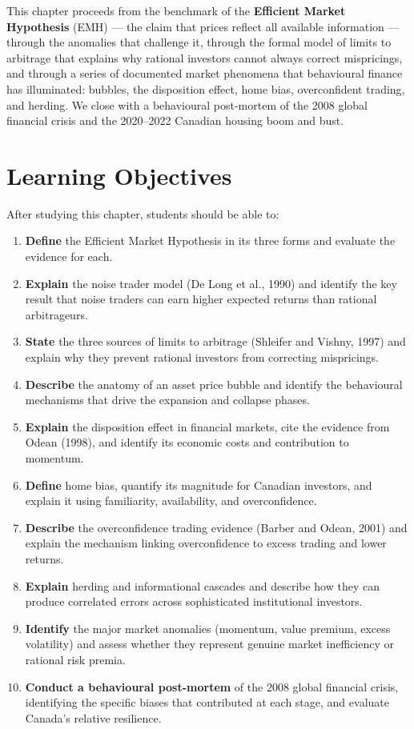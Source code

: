 \documentclass[12pt, letterpaper]{article}
\begin{document}
This chapter proceeds from the benchmark of the \textbf{Efficient Market Hypothesis} (EMH) --- the claim that prices reflect all available information --- through the anomalies that challenge it, through the formal model of limits to arbitrage that explains why rational investors cannot always correct mispricings, and through a series of documented market phenomena that behavioural finance has illuminated: bubbles, the disposition effect, home bias, overconfident trading, and herding. We close with a behavioural post-mortem of the 2008 global financial crisis and the 2020--2022 Canadian housing boom and bust.

\medskip


\section*{Learning Objectives}


After studying this chapter, students should be able to:

\begin{enumerate}
\item \textbf{Define} the Efficient Market Hypothesis in its three forms and evaluate the evidence for each.
\item \textbf{Explain} the noise trader model (De Long et al., 1990) and identify the key result that noise traders can earn higher expected returns than rational arbitrageurs.
\item \textbf{State} the three sources of limits to arbitrage (Shleifer and Vishny, 1997) and explain why they prevent rational investors from correcting mispricings.
\item \textbf{Describe} the anatomy of an asset price bubble and identify the behavioural mechanisms that drive the expansion and collapse phases.
\item \textbf{Explain} the disposition effect in financial markets, cite the evidence from Odean (1998), and identify its economic costs and contribution to momentum.
\item \textbf{Define} home bias, quantify its magnitude for Canadian investors, and explain it using familiarity, availability, and overconfidence.
\item \textbf{Describe} the overconfidence trading evidence (Barber and Odean, 2001) and explain the mechanism linking overconfidence to excess trading and lower returns.
\item \textbf{Explain} herding and informational cascades and describe how they can produce correlated errors across sophisticated institutional investors.
\item \textbf{Identify} the major market anomalies (momentum, value premium, excess volatility) and assess whether they represent genuine market inefficiency or rational risk premia.
\item \textbf{Conduct a behavioural post-mortem} of the 2008 global financial crisis, identifying the specific biases that contributed at each stage, and evaluate Canada's relative resilience.
\end{enumerate}
\end{document}
